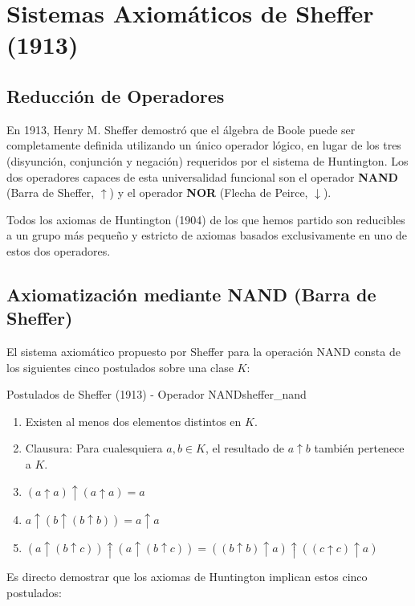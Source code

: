 \chapter{Sistemas Axiomáticos de Sheffer (1913)}

\section{Reducción de Operadores}

En 1913, Henry M. Sheffer demostró que el álgebra de Boole puede ser completamente definida utilizando un único operador lógico, en lugar de los tres (disyunción, conjunción y negación) requeridos por el sistema de Huntington. Los dos operadores capaces de esta universalidad funcional son el operador \textbf{NAND} (Barra de Sheffer, $\uparrow$) y el operador \textbf{NOR} (Flecha de Peirce, $\downarrow$). 

Todos los axiomas de Huntington (1904) de los que hemos partido son reducibles a un grupo más pequeño y estricto de axiomas basados exclusivamente en uno de estos dos operadores.

\section{Axiomatización mediante NAND (Barra de Sheffer)}

El sistema axiomático propuesto por Sheffer para la operación NAND consta de los siguientes cinco postulados sobre una clase $K$:

\begin{teorema}{Postulados de Sheffer (1913) - Operador NAND}{sheffer_nand}
\begin{enumerate}
    \item Existen al menos dos elementos distintos en $K$.
    \item Clausura: Para cualesquiera $a, b \in K$, el resultado de $a \uparrow b$ también pertenece a $K$.
    \item $(a \uparrow a) \uparrow (a \uparrow a) = a$
    \item $a \uparrow (b \uparrow (b \uparrow b)) = a \uparrow a$
    \item $(a \uparrow (b \uparrow c)) \uparrow (a \uparrow (b \uparrow c)) = ((b \uparrow b) \uparrow a) \uparrow ((c \uparrow c) \uparrow a)$
\end{enumerate}
\end{teorema}

Es directo demostrar que los axiomas de Huntington implican estos cinco postulados:


